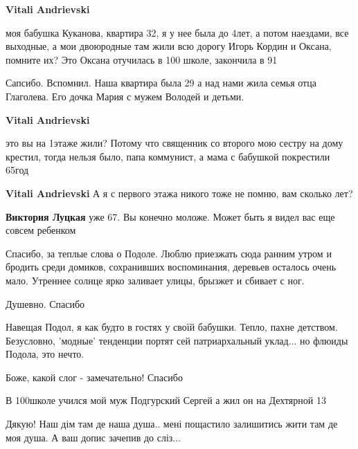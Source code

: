 \begin{itemize}
\begin{itemize}
\begin{itemize} %
\textbf{Vitali Andrievski} 

моя бабушка Куканова, квартира 32, я у нее была до 4лет, а потом наездами, все
выходные, а мои двоюродные там жили всю дорогу Игорь Кордин и Оксана, помните
их? Это Оксана отучилась в 100 школе, закончила в 91

\end{itemize} %


Сапсибо. Вспомнил. Наша квартира была 29 а над нами жила семья отца Глаголева.
Его дочка Мария с мужем Володей и детьми.

\begin{itemize} %
\textbf{Vitali Andrievski} 

это вы на 1этаже жили? Потому что священник со второго мою сестру на дому
крестил, тогда нельзя было, папа коммунист, а мама с бабушкой покрестили 65год

\textbf{Vitali Andrievski} А я с первого этажа никого тоже не помню, вам сколько лет?

\textbf{Виктория Луцкая} уже 67. Вы конечно моложе. Может быть я видел вас еще совсем ребенком
\end{itemize} %

\end{itemize} %


Спасибо, за теплые слова о Подоле. Люблю приезжать сюда ранним утром и бродить
среди домиков, сохранивших воспоминания, деревьев осталось очень мало. Утреннее
солнце ярко заливает улицы, брызжет и сбивает с ног.

Душевно. Спасибо


Навещая Подол, я как будто в гостях у своїй бабушки. Тепло, пахне детством.
Безусловно, 'модные' тенденции портят сей патриархальный уклад... но флюиды
Подола, это нечто.

Боже, какой слог - замечательно! Спасибо

В 100школе учился мой муж Подгурский Сергей а жил он на Дехтярной 13


Дякую! Наш дім там де наша душа.. мені пощастило залишитись жити там де моя
душа. А ваш допис зачепив до сліз...


\end{itemize}
